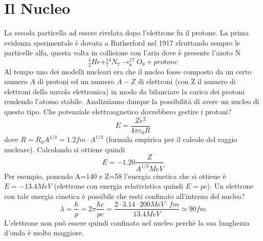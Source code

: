 
\section{Il Nucleo}
La secoda particella ad essere rivelata dopo l'elettrone fu il protone. 
La prima evidenza sperimentale è dovuta a Rutherford nel 1917 sfruttando sempre le particelle alfa, questa volta in collisione con l'aria dove è presente l'azoto N 
\begin{equation}
^4_2He +^{14}_{7}N_{7}\longrightarrow ^{17}_8O_9+protone
\end{equation}
Al tempo uno dei modelli nucleari era che il nucleo fosse composto da un certo numero $A$ di protoni ed un numero $A-Z$ di elettroni (con Z il numero di elettroni della nuvola elettronica) in modo da bilanciare la carica dei protoni rendendo l'atomo stabile.
Analizziamo dunque la possibilità di avere un nucleo di questo tipo.
Che potenziale elettroagnetico dovrebbero gestire i protoni?
\[E=\frac{Ze^2}{4\pi\varepsilon_0R}\]
dove $R=R_0 A^{1/3}=1.2fm\cdot A^{1/3}$ (formula empirica per il calcolo del raggio nucleare). 
Calcolando si ottiene quindi
\[E=-1.20\frac{Z}{A^{1/3}MeV}\]
Per esempio, ponendo A=140 e Z=58 l'energia cinetica che si ottiene è $E=-13.4MeV$ (elettrone con energia relativistica quindi $E=pc$). Un elettrone con tale energia cinetica è possibile che resti confinato all'interno del nucleo?
\[\lambda=\frac{h}{p}=2\pi \frac{\hbar c}{pc}=\frac{2\cdot 3.14\cdot 200MeV\cdot fm}{13.4MeV}\simeq 90fm\]
L'elettrone non può essere quindi confinato nel nucleo perchè la sua lunghezza d'onda è molto maggiore.

